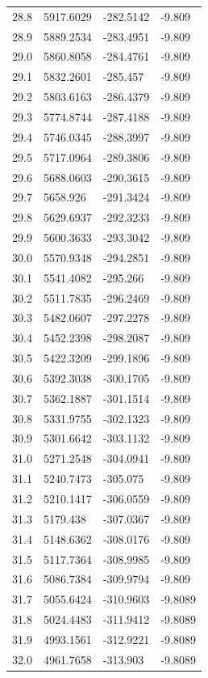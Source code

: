 \begin{table}[H]
\begin{tabular}{llll}
28.8 & 5917.6029 & -282.5142 & -9.809 \\
28.9 & 5889.2534 & -283.4951 & -9.809 \\
29.0 & 5860.8058 & -284.4761 & -9.809 \\
29.1 & 5832.2601 & -285.457 & -9.809 \\
29.2 & 5803.6163 & -286.4379 & -9.809 \\
29.3 & 5774.8744 & -287.4188 & -9.809 \\
29.4 & 5746.0345 & -288.3997 & -9.809 \\
29.5 & 5717.0964 & -289.3806 & -9.809 \\
29.6 & 5688.0603 & -290.3615 & -9.809 \\
29.7 & 5658.926 & -291.3424 & -9.809 \\
29.8 & 5629.6937 & -292.3233 & -9.809 \\
29.9 & 5600.3633 & -293.3042 & -9.809 \\
30.0 & 5570.9348 & -294.2851 & -9.809 \\
30.1 & 5541.4082 & -295.266 & -9.809 \\
30.2 & 5511.7835 & -296.2469 & -9.809 \\
30.3 & 5482.0607 & -297.2278 & -9.809 \\
30.4 & 5452.2398 & -298.2087 & -9.809 \\
30.5 & 5422.3209 & -299.1896 & -9.809 \\
30.6 & 5392.3038 & -300.1705 & -9.809 \\
30.7 & 5362.1887 & -301.1514 & -9.809 \\
30.8 & 5331.9755 & -302.1323 & -9.809 \\
30.9 & 5301.6642 & -303.1132 & -9.809 \\
31.0 & 5271.2548 & -304.0941 & -9.809 \\
31.1 & 5240.7473 & -305.075 & -9.809 \\
31.2 & 5210.1417 & -306.0559 & -9.809 \\
31.3 & 5179.438 & -307.0367 & -9.809 \\
31.4 & 5148.6362 & -308.0176 & -9.809 \\
31.5 & 5117.7364 & -308.9985 & -9.809 \\
31.6 & 5086.7384 & -309.9794 & -9.809 \\
31.7 & 5055.6424 & -310.9603 & -9.8089 \\
31.8 & 5024.4483 & -311.9412 & -9.8089 \\
31.9 & 4993.1561 & -312.9221 & -9.8089 \\
32.0 & 4961.7658 & -313.903 & -9.8089 \\

\end{tabular}
\end{table}

